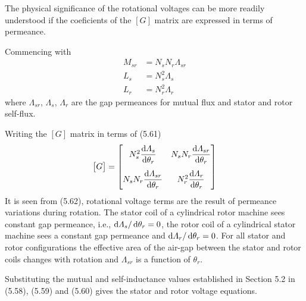 \documentclass[a4paper,numbers=noenddot,12pt]{scrbook}
\begin{document}
            The physical significance of the rotational voltages can be more readily understood if the coeficients of the $[G]$ matrix are expressed in terms of permeance.

            Commencing with
            \begin{equation}
                \begin{aligned}
                    M_{sr} & = N_s N_r \varLambda_{sr}\\
                    L_s & = N_s^2 \varLambda_s\\
                    L_r & = N_r^2 \varLambda_r
                \end{aligned}
            \end{equation}
            where $\varLambda_{sr}$, $\varLambda_s$, $\varLambda_r$ are the gap permeances for mutual flux and stator and rotor self-flux.

            Writing the $[G]$ matrix in terms of (5.61)
            \begin{equation}
                \begin{bmatrix}
                    G
                \end{bmatrix} = 
                \begin{bmatrix}
                    N_s^2 \dfrac{\dif \varLambda_s}{\dif \theta_r} & N_s N_r \dfrac{\dif \varLambda_{sr}}{\dif \theta_r} \\[3ex]
                    N_s N_r \dfrac{\dif \varLambda_{sr}}{\dif \theta_r} & N_r^2 \dfrac{\dif \varLambda_r}{\dif \theta_r}  
                \end{bmatrix}
            \end{equation}
            It is seen from (5.62), rotational voltage terms are the result of permeance variations during rotation. The stator coil of a cylindrical rotor machine sees constant gap permeance, i.e., $\dif \varLambda_s / \dif \theta_r = 0$, the rotor coil of a cylindrical stator machine sees a constant gap permeance and $\dif \varLambda_r / \dif \theta_r = 0$. For all stator and rotor configurations the effective area of the air-gap between the stator and rotor coils changes with rotation and $\varLambda_{sr}$ is a function of $\theta_r$.

            Substituting the mutual and self-inductance values established in Section 5.2 in (5.58), (5.59) and (5.60) gives the stator and rotor voltage equations. 
\end{document}
